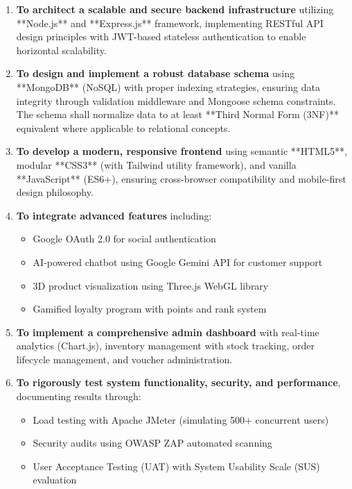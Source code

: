 \documentclass[12pt, a4paper]{report}
\begin{document}
\begin{enumerate}
    \item \textbf{To architect a scalable and secure backend infrastructure} utilizing **Node.js** and **Express.js** framework, implementing RESTful API design principles with JWT-based stateless authentication to enable horizontal scalability.
    
    \item \textbf{To design and implement a robust database schema} using **MongoDB** (NoSQL) with proper indexing strategies, ensuring data integrity through validation middleware and Mongoose schema constraints. The schema shall normalize data to at least **Third Normal Form (3NF)** equivalent where applicable to relational concepts.
    
    \item \textbf{To develop a modern, responsive frontend} using semantic **HTML5**, modular **CSS3** (with Tailwind utility framework), and vanilla **JavaScript** (ES6+), ensuring cross-browser compatibility and mobile-first design philosophy.
    
    \item \textbf{To integrate advanced features} including:
    \begin{itemize}
        \item Google OAuth 2.0 for social authentication
        \item AI-powered chatbot using Google Gemini API for customer support
        \item 3D product visualization using Three.js WebGL library
        \item Gamified loyalty program with points and rank system
    \end{itemize}
    
    \item \textbf{To implement a comprehensive admin dashboard} with real-time analytics (Chart.js), inventory management with stock tracking, order lifecycle management, and voucher administration.
    
    \item \textbf{To rigorously test system functionality, security, and performance}, documenting results through:
    \begin{itemize}
        \item Load testing with Apache JMeter (simulating 500+ concurrent users)
        \item Security audits using OWASP ZAP automated scanning
        \item User Acceptance Testing (UAT) with System Usability Scale (SUS) evaluation
    \end{itemize}
\end{enumerate}
\end{document}
